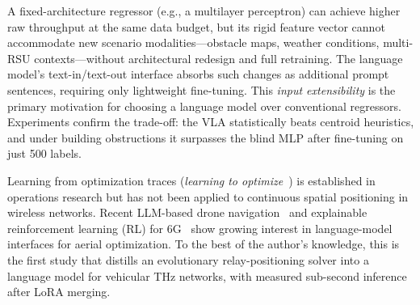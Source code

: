 \documentclass[journal]{IEEEtran}
\begin{document}
A fixed-architecture regressor (e.g., a multilayer perceptron) can achieve higher raw throughput at the same data budget, but its rigid feature vector cannot accommodate new scenario modalities---obstacle maps, weather conditions, multi-RSU contexts---without architectural redesign and full retraining. The language model's text-in/text-out interface absorbs such changes as additional prompt sentences, requiring only lightweight fine-tuning. This \emph{input extensibility} is the primary motivation for choosing a language model over conventional regressors. Experiments confirm the trade-off: the VLA statistically beats centroid heuristics, and under building obstructions it surpasses the blind MLP after fine-tuning on just 500 labels.

Learning from optimization traces (\emph{learning to optimize}~\cite{bengio2021}) is established in operations research but has not been applied to continuous spatial positioning in wireless networks. Recent LLM-based drone navigation~\cite{khan2025llmnav} and explainable reinforcement learning (RL) for 6G~\cite{aranacatania2025xdrl} show growing interest in language-model interfaces for aerial optimization. To the best of the author's knowledge, this is the first study that distills an evolutionary relay-positioning solver into a language model for vehicular THz networks, with measured sub-second inference after LoRA merging.
\end{document}
